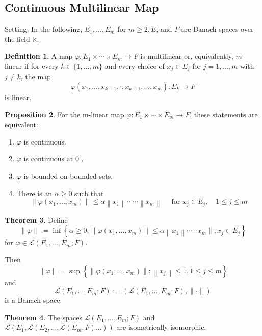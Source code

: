 \documentclass[12pt,a4paper]{book}
\newenvironment{enu}{\begin{enumerate}[(1)]}{\end{enumerate}}
\theoremstyle{definition}
\newtheorem{defn}{Definition}[section]
\newtheorem{theo}[defn]{Theorem}
\newtheorem{prop}[defn]{Proposition}
\begin{document}
\subsection{Continuous Multilinear Map}
Setting: 
In the following, $E_1, \ldots, E_m$ for $m \geq 2, E$, and $F$ are Banach spaces over the field $\mathbb{K}$. 
\begin{defn} 
A map $\varphi: E_1 \times \cdots \times E_m \rightarrow F$ is multilinear or, equivalently, $m$-linear if for every $k \in\{1, \ldots, m\}$ and every choice of $x_j \in E_j$ for $j=1, \ldots, m$ with $j \neq k$, the map
$$
\varphi\left(x_1, \ldots, x_{k-1}, \cdot, x_{k+1}, \ldots, x_m\right): E_k \rightarrow F
$$
is linear.
\end{defn}
\begin{prop}
    For the m-linear map $\varphi: E_1 \times \cdots \times E_m \rightarrow F$, these statements are equivalent:
\begin{enu} 
    \item $\varphi$ is continuous.
    \item $\varphi$ is continuous at 0 .
    \item $\varphi$ is bounded on bounded sets.
    \item There is an $\alpha \geq 0$ such that
    $$
    \left\|\varphi\left(x_1, \ldots, x_m\right)\right\| \leq \alpha\left\|x_1\right\| \cdots \cdots\left\|x_m\right\| \quad \text { for } x_j \in E_j, \quad 1 \leq j \leq m
    $$
\end{enu}
\end{prop}
\begin{theo}
    Define
    $$
    \|\varphi\|:=\inf \left\{\alpha \geq 0 ;\left\|\varphi\left(x_1, \ldots, x_m\right)\right\| \leq \alpha\left\|x_1\right\| \cdots \cdots x_m \|, x_j \in E_j\right\}
    $$
    for $\varphi \in \mathcal{L}\left(E_1, \ldots, E_m ; F\right)$.
    
    Then
    $$
    \|\varphi\|=\sup \left\{\left\|\varphi\left(x_1, \ldots, x_m\right)\right\| ;\left\|x_j\right\| \leq 1,1 \leq j \leq m\right\}
    $$
    and
    $$
    \mathcal{L}\left(E_1, \ldots, E_m ; F\right):=\left(\mathcal{L}\left(E_1, \ldots, E_m ; F\right),\|\cdot\|\right)
    $$
    is a Banach space.
\end{theo}
\begin{theo}
    The spaces $\mathcal{L}\left(E_1, \ldots, E_m ; F\right)$ and $\mathcal{L}\left(E_1, \mathcal{L}\left(E_2, \ldots, \mathcal{L}\left(E_m, F\right) \ldots\right)\right)$ are isometrically isomorphic.
\end{theo}
\end{document}
